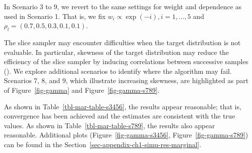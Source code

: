 \documentclass[
  letterpaper,
  double,
  12pt,
  1.0in]{beavtex}
\begin{document}
In Scenario 3 to 9, we revert to the same settings for weight and
dependence as used in Scenario 1. That is, we fix
\(w_i \propto \exp(-i), i = 1,..., 5\) and
\(\rho_l = (0.7, 0.5, 0.3, 0.1, 0.1)\).

The slice sampler may encounter difficulties when the target
distribution is not evaluable. In particular, skewness of the target
distribution may reduce the efficiency of the slice sampler by inducing
correlations between successive samples
(). We explore
additional scenarios to identify where the algorithm may fail. Scenarios
7, 8, and 9, which illustrate increasing skewness, are highlighted as
part of Figure~\ref{fig-gamma} and Figure~\ref{fig-gamma-s789}.

As shown in Table~\ref{tbl-mar-table-s3456}, the results appear
reasonable; that is, convergence has been achieved and the estimates are
consistent with the true values. As shown in
Table~\ref{tbl-mar-table-s789}, the results also appear reasonable.
Additional plots (Figure~\ref{fig-gamma-s3456},
Figure~\ref{fig-gamma-s789}) can be found in the
Section~\ref{sec-appendix-ch1-simu-res-marginal}.

\begin{table}

\caption{\label{tbl-mar-table-s3456}Results for Scenario 3-6}


\end{table}%
\end{document}
